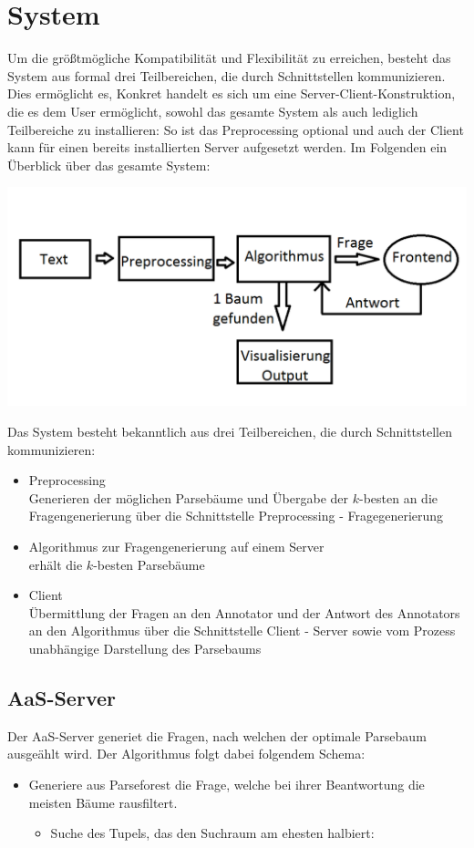 \documentclass{scrartcl}
\begin{document}
\section{System}
\label{sec:System}
Um die größtmögliche Kompatibilität und Flexibilität zu erreichen, besteht das System aus formal drei Teilbereichen, die durch Schnittstellen kommunizieren. Dies ermöglicht es, 
Konkret handelt es sich um eine Server-Client-Konstruktion, die es dem User ermöglicht, sowohl das gesamte System als auch lediglich Teilbereiche zu installieren: So ist das Preprocessing optional und auch der Client kann für einen bereits installierten Server aufgesetzt werden.
Im Folgenden ein Überblick über das gesamte System:
\begin{center}
 \includegraphics[scale=0.4]{Grafik}
 \end{center}
Das System besteht bekanntlich aus drei Teilbereichen, die durch Schnittstellen kommunizieren:
\begin{itemize}
\item Preprocessing\\Generieren der möglichen Parsebäume und Übergabe der $k$-besten an die Fragengenerierung über die Schnittstelle Preprocessing - Fragegenerierung
\item Algorithmus zur Fragengenerierung auf einem Server\\erhält die $k$-besten Parsebäume 
\item Client\\Übermittlung der
Fragen an den Annotator und der Antwort des Annotators an den Algorithmus über die Schnittstelle Client - Server sowie vom Prozess unabhängige Darstellung des Parsebaums 
\end{itemize}

\subsection{AaS-Server}
\label{sub:AaS-Server}
Der AaS-Server generiet die Fragen, nach welchen der optimale Parsebaum ausgeählt wird. Der Algorithmus folgt dabei folgendem Schema:
    \begin{itemize}
        \item Generiere aus Parseforest die Frage, welche bei ihrer Beantwortung die meisten Bäume rausfiltert.
            \begin{itemize}
                \item Suche des Tupels, das den Suchraum am ehesten halbiert:
            \end{itemize}
    \end{itemize}
\end{document}
